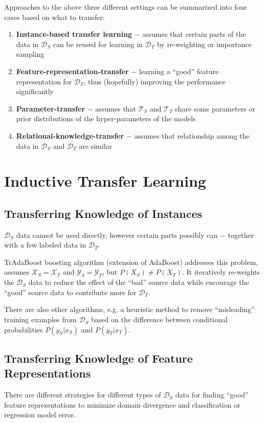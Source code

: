 \documentclass[a4paper,twocolumn]{article}
\newcommand{\D}{\mathcal{D}}
\newcommand{\T}{\mathcal{T}}
\newcommand{\X}{\mathcal{X}}
\newcommand{\Y}{\mathcal{Y}}
\begin{document}
Approaches to the above three different settings can be summarized into four cases based on what to transfer:

\begin{enumerate}
    \item \textbf{Instance-based transfer learning} $-$ assumes that certain parts of the data in $\D_S$ can be reused for learning in $\D_T$ by re-weighting or importance sampling
    \item \textbf{Feature-representation-transfer} $-$ learning a ``good'' feature representation for $\D_T$, thus (hopefully) improving the performance significantly
    \item \textbf{Parameter-transfer} $-$ assumes that $\T_S$ and $\T_T$ share some parameters or prior distributions of the hyper-parameters of the models
    \item \textbf{Relational-knowledge-transfer} $-$ assumes that relationship among the data in $\D_S$ and $\D_T$ are similar
\end{enumerate}

\section{Inductive Transfer Learning}
\subsection{Transferring Knowledge of Instances}
$\D_S$ data cannot be used directly, however certain parts possibly can $-$ together with a few labeled data in $\D_T$.

TrAdaBoost boosting algorithm (extension of AdaBoost) addresses this problem, assumes $\X_S = \X_T$ and $\Y_S = \Y_T$, but $P(X_S) \ne P(X_T)$. It iteratively re-weights the $\D_S$ data to reduce the effect of the ``bad'' source data while encourage the ``good'' source data to contribute more for $\D_T$.

There are also other algorithms, e.g. a heuristic method to remove ``misleading'' training examples from $\D_S$ based on the difference between conditional probabilities $P(y_S|x_S)$ and $P(y_T|x_T)$.

\subsection{Transferring Knowledge of Feature Representations}
There are different strategies for different types of $\D_S$ data for finding ``good'' feature reprezentations to minimize domain divergence and classification or regression model error.
\end{document}
